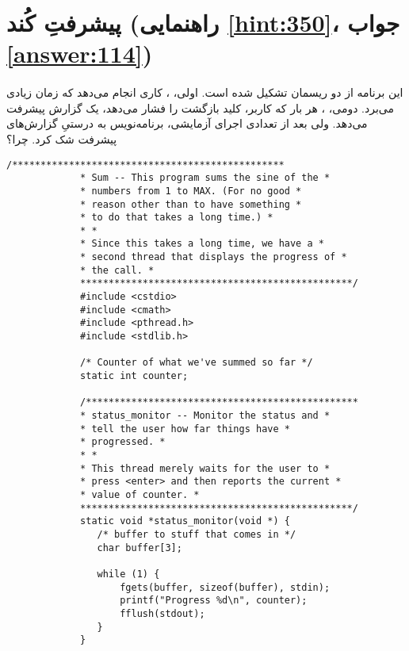 \section[پیشرفتِ کُند]{پیشرفتِ کُند \protect{} (راهنمایی \ref{hint:350}، جواب \ref{answer:114})}
\paragraph{}\label{prog:114}
این برنامه از دو ریسمان تشکیل شده است. اولی، ، کاری انجام می‌دهد که زمان زیادی می‌برد. دومی، ، هر بار که کاربر، کلید بازگشت را فشار می‌دهد، یک گزارش پیشرفت می‌دهد. ولی بعد از تعدادی اجرای آزمایشی، برنامه‌نویس به درستیِ گزارش‌های پیشرفت شک کرد. چرا؟

\begin{LTR}
        \begin{lstlisting}[style=C++Style]
             /************************************************
             * Sum -- This program sums the sine of the *
             * numbers from 1 to MAX. (For no good *
             * reason other than to have something *
             * to do that takes a long time.) *
             * *
             * Since this takes a long time, we have a *
             * second thread that displays the progress of *
             * the call. *
             ************************************************/
             #include <cstdio>
             #include <cmath>
             #include <pthread.h>
             #include <stdlib.h>

             /* Counter of what we've summed so far */
             static int counter;

             /************************************************
             * status_monitor -- Monitor the status and *
             * tell the user how far things have *
             * progressed. *
             * *
             * This thread merely waits for the user to *
             * press <enter> and then reports the current *
             * value of counter. *
             ************************************************/
             static void *status_monitor(void *) {
             	/* buffer to stuff that comes in */
             	char buffer[3];

             	while (1) {
            		fgets(buffer, sizeof(buffer), stdin);
             		printf("Progress %d\n", counter);
             		fflush(stdout);
             	}
             }


\end{lstlisting}
\end{LTR}

